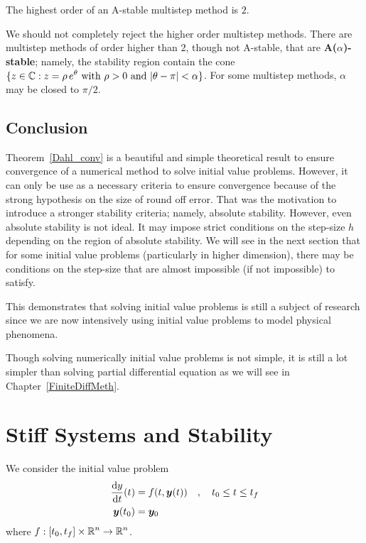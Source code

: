 \begin{theorem}
The highest order of an A-stable multistep method is $2$.
\label{Dahl2ndB}
\end{theorem}

\begin{rmk}
We should not completely reject the higher order multistep methods.
There are multistep methods of order higher than $2$, though not
A-stable, that are
{\bfseries A($\alpha$)-stable};
namely, the stability region contain the cone
$\DS \{ z \in \CC : z = \rho\,e^\theta \ \text{with}\ \rho>0
\ \text{and}\ |\theta-\pi|<\alpha \}$.  For some multistep methods, $\alpha$ may
be closed to $\pi/2$.
\end{rmk}

\subsection{Conclusion}

Theorem~\ref{Dahl_conv} is a beautiful and simple theoretical result
to ensure convergence of a numerical method to solve initial value
problems.  However, it can only be use as a necessary criteria to
ensure convergence because of the strong hypothesis on the size of
round off error.  That was the motivation to introduce a stronger
stability criteria; namely, absolute stability.  However, even
absolute stability is not ideal.  It may impose strict conditions on
the step-size $h$ depending on the region of absolute stability.  We
will see in the next section that for some initial value problems
(particularly in higher dimension), there may be conditions on the
step-size that are almost impossible (if not impossible) to satisfy.

This demonstrates that solving initial value problems is still a
subject of research since we are now intensively using initial value
problems to model physical phenomena.

Though solving numerically initial value problems is not simple, it is
still a lot simpler than solving partial differential equation as we
will see in Chapter~\ref{FiniteDiffMeth}.

\section{Stiff Systems and Stability}

We consider the initial value problem
\begin{equation} \label{SODE}
\begin{split}
\frac{\mathrm{d}y}{\mathrm{d}{t}}(t) &= f(t,\bm{y}(t)) \quad , \quad t_0 \leq t \leq t_f \\
\bm{y}(t_0) & = \bm{y}_0
\end{split}
\end{equation}
where $\displaystyle f:[t_0,t_f]\times\mathbb{R}^n \rightarrow \mathbb{R}^n$.

